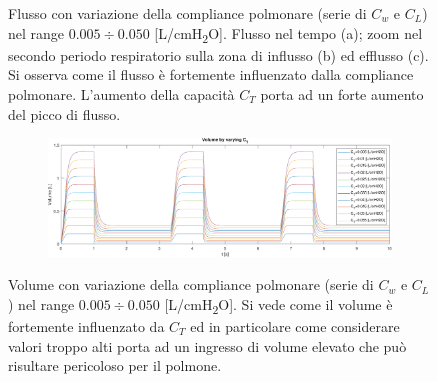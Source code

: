 \begin{figure}[t!]
\begin{subfigure}{0.5\linewidth}
		\caption{}
	\end{subfigure}\hfill
	\caption{Flusso con variazione della compliance polmonare (serie di $C_w$ e $C_L$) nel range $0.005\div 0.050$ [L/cmH\textsubscript{2}O]. Flusso nel tempo (a); zoom nel secondo periodo respiratorio sulla zona di influsso (b) ed efflusso (c). Si osserva come il flusso è fortemente influenzato dalla compliance polmonare. L'aumento della capacità $C_T$ porta ad un forte aumento del picco di flusso.}
	\vspace{0.8 cm}
	\begin{subfigure}{\linewidth}
		\centering
		\includegraphics[width=0.95\linewidth]{../model/data_log/CwCL_volume_total.pdf}
	\end{subfigure}\hfill
	\caption{Volume con variazione della compliance polmonare (serie di $C_w$ e $C_L$) nel range $0.005\div 0.050$ [L/cmH\textsubscript{2}O]. Si vede come il volume è fortemente influenzato da $C_T$ ed in particolare come considerare valori troppo alti porta ad un ingresso di volume elevato che può risultare pericoloso per il polmone.}
\end{figure}


